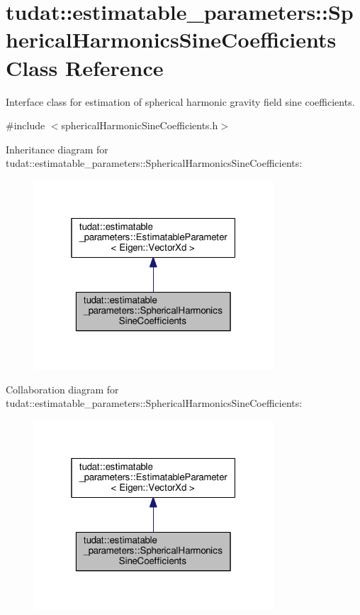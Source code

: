 \hypertarget{classtudat_1_1estimatable__parameters_1_1SphericalHarmonicsSineCoefficients}{}\section{tudat\+:\+:estimatable\+\_\+parameters\+:\+:Spherical\+Harmonics\+Sine\+Coefficients Class Reference}
\label{classtudat_1_1estimatable__parameters_1_1SphericalHarmonicsSineCoefficients}


Interface class for estimation of spherical harmonic gravity field sine coefficients.  




{\ttfamily \#include $<$spherical\+Harmonic\+Sine\+Coefficients.\+h$>$}



Inheritance diagram for tudat\+:\+:estimatable\+\_\+parameters\+:\+:Spherical\+Harmonics\+Sine\+Coefficients\+:
\nopagebreak
\begin{figure}[H]
\begin{center}
\leavevmode
\includegraphics[width=253pt]{classtudat_1_1estimatable__parameters_1_1SphericalHarmonicsSineCoefficients__inherit__graph}
\end{center}
\end{figure}


Collaboration diagram for tudat\+:\+:estimatable\+\_\+parameters\+:\+:Spherical\+Harmonics\+Sine\+Coefficients\+:
\nopagebreak
\begin{figure}[H]
\begin{center}
\leavevmode
\includegraphics[width=253pt]{classtudat_1_1estimatable__parameters_1_1SphericalHarmonicsSineCoefficients__coll__graph}
\end{center}
\end{figure}
